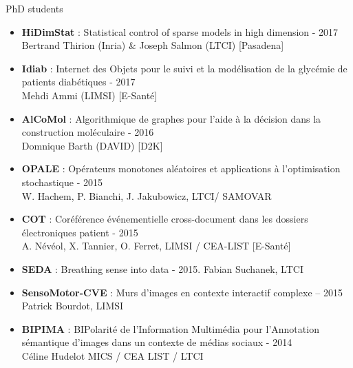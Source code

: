 \begin{frame}{PhD students}

\begin{itemize}
\item 
\small
\textbf{HiDimStat} : Statistical control of sparse models in high dimension - 2017
\\
Bertrand Thirion (Inria) \& Joseph Salmon (LTCI) {\color{red} [Pasadena]}
\item
\textbf{Idiab} : Internet des Objets pour le suivi et la mod\'elisation de la glyc\'emie de patients
diab\'etiques - 2017
\\
Mehdi Ammi (LIMSI) {\color{red} [E-Santé]}
\item
\textbf{AlCoMol} : Algorithmique de graphes pour l'aide à la d\'ecision dans la construction
mol\'eculaire - 2016
\\
Domnique Barth (DAVID) {\color{red} [D2K]}
\item 
\textbf{OPALE} : Op\'erateurs monotones al\'eatoires et applications à l'optimisation stochastique -
2015
\\
W. Hachem, P. Bianchi, J. Jakubowicz, LTCI/ SAMOVAR
\item 
\textbf{COT} : Cor\'ef\'erence \'ev\'enementielle cross-document dans les dossiers \'electroniques
patient - 2015
\\
A. Névéol, X. Tannier, O. Ferret, LIMSI / CEA-LIST {\color{red} [E-Santé]}
\item 
\textbf{\color{red} SEDA} : Breathing sense into data - 2015. Fabian Suchanek, LTCI
\item 
\textbf{SensoMotor-CVE} : Murs d'images en contexte interactif complexe – 2015
\\
Patrick Bourdot, LIMSI
\item
\textbf{BIPIMA} : BIPolarit\'e de l'Information Multim\'edia pour l'Annotation s\'emantique d'images
dans un contexte de m\'edias sociaux - 2014
\\
C\'eline Hudelot  MICS / CEA LIST / LTCI
\end{itemize}
\end{frame}

